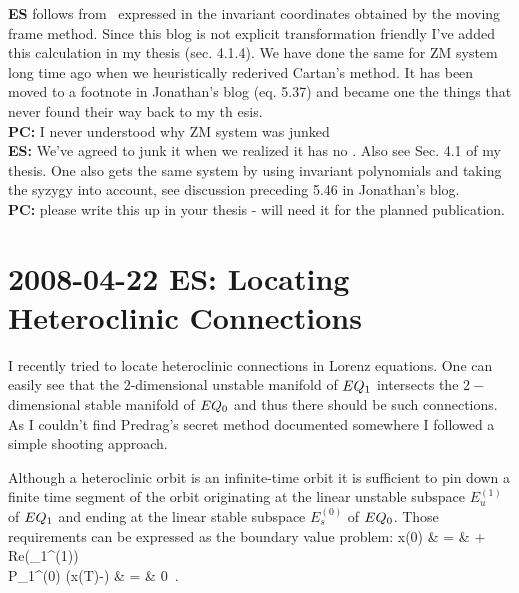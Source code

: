 {\bf ES} { follows from
\cLe\ expressed in the invariant coordinates obtained by the moving frame
method. Since this blog is not explicit transformation
friendly I've added this calculation in my thesis (sec. 4.1.4).
We have done the same
for ZM system long time ago when we heuristically
rederived Cartan's method. It has been moved to a footnote in Jonathan's
blog (eq. 5.37) and became one the things that never found their way back to my th
esis.
\\
{\bf PC:} I never understood why ZM system was junked
\\
{\bf ES:} We've agreed to
junk it when we realized it has no \reqva. Also see Sec. 4.1 of my thesis.
One also gets the same system by using invariant
polynomials and taking the syzygy into account, see discussion preceding 5.46 in
Jonathan's blog.
\\
{\bf PC:} please write this up in your thesis - will need it for
the planned publication.}



\section{2008-04-22 ES: Locating Heteroclinic Connections}

I recently tried to locate heteroclinic connections in Lorenz equations. One
can easily see that the 2-dimensional unstable manifold of $EQ_{1}$ intersects the
$2-$dimensional stable manifold of $EQ_{0}$ and thus there should be such connections.
As I couldn't find Predrag's secret method documented somewhere I followed a simple
shooting approach.

Although a heteroclinic orbit is an infinite-time orbit it is sufficient to
pin down a finite time segment of the orbit originating at the linear unstable subspace $E_u^{(1)}$
of $EQ_{1}$ and ending at the linear stable subspace $E_s^{(0)}$ of $EQ_{0}$. Those
requirements can be expressed as the boundary value problem:
\bea
	x(0) & = & + \epsilon Re(_1^{(1)}) \, \label{eq:shootHetIC} \\
	P_1^{(0)} (x(T)-) & = &  0 \,. \label{eq:shootHetBC}
\eea

